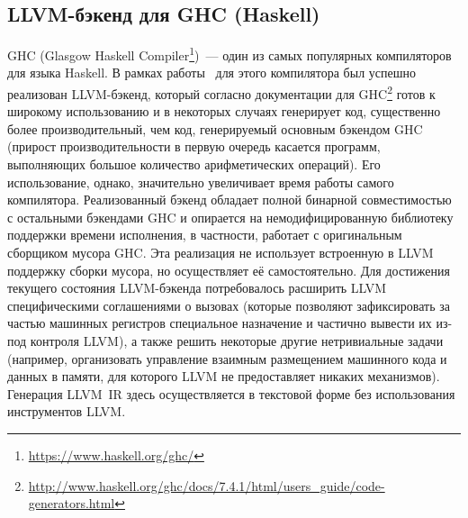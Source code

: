 \documentclass[a4paper, 12pt]{article}
\begin{document}
\subsection{LLVM-бэкенд для GHC (Haskell)}
GHC (Glasgow Haskell Compiler\footnote{\url{https://www.haskell.org/ghc/}})~--- один из самых популярных компиляторов
для
языка Haskell. В рамках работы~\cite{GHC} для этого компилятора был успешно реализован LLVM-бэкенд, который согласно
документации для GHC\footnote{\url{http://www.haskell.org/ghc/docs/7.4.1/html/users\_guide/code-generators.html}} готов
к
широкому использованию и в некоторых
случаях генерирует код, существенно более производительный, чем код, генерируемый основным бэкендом GHC (прирост
производительности в первую очередь касается программ, выполняющих большое количество арифметических
операций). Его использование, однако, значительно увеличивает время работы самого компилятора. Реализованный бэкенд
обладает полной бинарной совместимостью с остальными бэкендами GHC и опирается на немодифицированную библиотеку
поддержки времени исполнения, в частности, работает с оригинальным сборщиком мусора GHC.
Эта реализация не использует встроенную в LLVM поддержку сборки мусора, но осуществляет её самостоятельно. Для
достижения текущего состояния LLVM-бэкенда потребовалось расширить LLVM специфическими соглашениями о вызовах
(которые позволяют зафиксировать за частью машинных регистров специальное назначение и частично вывести их из-под
контроля LLVM), а также решить некоторые другие нетривиальные задачи (например, организовать управление взаимным
размещением машинного кода и данных в памяти, для которого LLVM не предоставляет никаких механизмов). Генерация LLVM~IR
здесь осуществляется в текстовой форме без использования инструментов LLVM.
\end{document}
